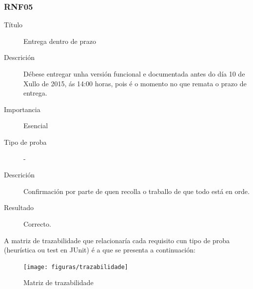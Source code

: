 \subsubsection*{RNF05}
\begin{description}
\item[Título] \hfill
Entrega dentro de prazo
\item[Descrición] \hfill
Débese entregar unha versión funcional e documentada antes do día 10 de Xullo de 2015, ás 14:00 horas, pois é o momento no que remata o prazo de entrega.
\item[Importancia] \hfill
Esencial
\item[Tipo de proba] \hfill
-
\item[Descrición]
Confirmación por parte de quen recolla o traballo de que todo está en orde.
\item[Resultado]
Correcto.
\end{description}

A matriz de trazabilidade que relacionaría cada requisito cun tipo de proba (heurística ou test en JUnit) é a que se presenta a continuación:

\begin{figure}
\texttt{[image: figuras/trazabilidade]}
\caption{Matriz de trazabilidade}
\label{trazabilidade}
\end{figure}
